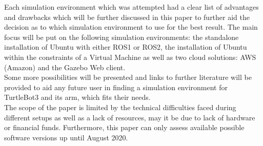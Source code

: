 \documentclass[plainarticle,zihtitle,english,final,hyperref,utf8]{zihpub}
\begin{document}
Each simulation environment which was attempted had a clear list of advantages and drawbacks which will be further discussed in this paper to further aid the decision as to which simulation environment to use for the best result. The main focus will be put on the following simulation environments: the standalone installation of Ubuntu with either ROS1 or ROS2, the installation of Ubuntu within the constraints of a Virtual Machine as well as two cloud solutions: AWS (Amazon) and the Gazebo Web client.\\
\newline
Some more possibilities will be presented and links to further literature will be provided to aid any future user in finding a simulation environment for TurtleBot3 and its arm, which fits their needs.\\
\newline
The scope of the paper is limited by the technical difficulties faced during different setups as well as a lack of resources, may it be due to lack of hardware or financial funds. Furthermore, this paper can only assess available possible software versions up until August 2020.\\
\newpage
\end{document}
